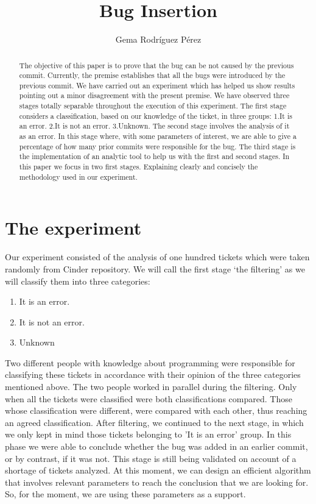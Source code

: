 \documentclass[a4paper]{article}
\title{Bug Insertion}
\author{Gema Rodríguez Pérez}
\date{}
\begin{document}
\maketitle

\begin{abstract}
The objective of this paper is to prove that the bug can be not caused by the previous commit. Currently, the premise establishes that all the bugs were introduced by the previous commit. We have carried out an experiment which has helped us show results pointing out a minor disagreement with the present premise. We have observed three stages totally separable throughout the execution of this experiment. The first stage considers a classification, based on our knowledge of the ticket, in three groups: 
 1.It is an error. 
 2.It is not an error. 
 3.Unknown. 
 The second stage involves the analysis of it as an error. In this stage where, with some parameters of interest, we are able to give a percentage of how many prior commits were responsible for the bug. 
The third stage is the implementation of an analytic tool to help us with the first and second stages. 
In this paper we focus in two first stages. Explaining clearly and concisely the methodology used in our experiment. 

\end{abstract}

\section{The experiment}

Our experiment consisted of the analysis of one hundred tickets which were taken randomly from Cinder repository. We will call the first stage ‘the filtering’ as we will classify them into three categories: 

\begin{enumerate}
    \item It is an error.
    \item It is not an error.
    \item Unknown
\end{enumerate}

Two different people with knowledge about programming were responsible for classifying these tickets in accordance with their opinion of the three categories mentioned above. The two people worked in parallel during the filtering. Only when all the tickets were classified were both classifications compared. Those whose classification were different, were compared with each other, thus reaching an agreed classification. 
After filtering, we continued to the next stage, in which we only kept in mind those tickets belonging to ’It is an error’ group. In this phase we were able to conclude whether the bug was added in an earlier commit, or by contrast, if it was not. This stage is still being validated on account of a shortage of tickets analyzed. At this moment, we can design an efficient algorithm that involves relevant parameters to reach the conclusion that we are looking for. So, for the moment, we are using these parameters as a support. 
\end{document}
